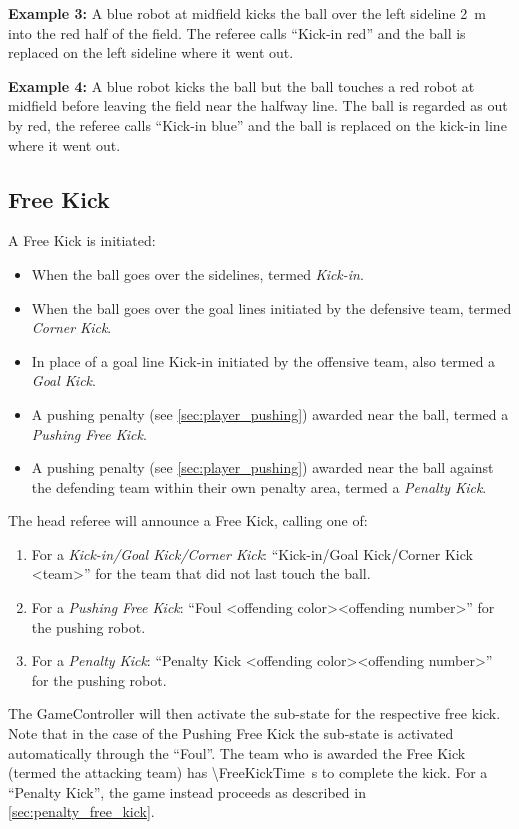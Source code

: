   \textbf{Example 3:} A blue robot at midfield kicks the ball over the left sideline \qty{2}{\metre} into the red half of the field. The referee calls ``Kick-in red'' and the ball is replaced on the left sideline where it went out.

  \textbf{Example 4:} A blue robot kicks the ball but the ball touches a red robot at midfield before leaving the field near the halfway line. The ball is regarded as out by red, the referee calls ``Kick-in blue'' and the ball is replaced on the kick-in line where it went out.

\subsection{Free Kick}
\label{sec:free_kick}

A Free Kick is initiated:
\begin{itemize}
  \item When the ball goes over the sidelines, termed \emph{Kick-in}.
  \item When the ball goes over the goal lines initiated by the defensive team, termed \emph{Corner Kick}.
  \item In place of a goal line Kick-in initiated by the offensive team, also termed a \emph{Goal Kick}.
  \item A pushing penalty (see \cref{sec:player_pushing}) awarded near the ball, termed a \emph{Pushing Free Kick}.
  \item A pushing penalty (see \cref{sec:player_pushing}) awarded near the ball against the defending team within their own penalty area, termed a \textit{Penalty Kick}.
\end{itemize}

The head referee will announce a Free Kick, calling one of:
\begin{enumerate}
  \item For a \textit{Kick-in/Goal Kick/Corner Kick}: ``Kick-in/Goal Kick/Corner Kick \textless team\textgreater'' for the team that did not last touch the ball.
  \item For a \textit{Pushing Free Kick}: ``Foul \textless offending color\textgreater \textless offending number\textgreater'' for the pushing robot.
  \item For a \textit{Penalty Kick}:  ``Penalty Kick \textless offending color\textgreater \textless offending number\textgreater'' for the pushing robot.
\end{enumerate}

The GameController will then activate the sub-state for the respective free kick. Note that in the case of the Pushing Free Kick the sub-state is activated automatically through the ``Foul''.
The team who is awarded the Free Kick (termed the attacking team) has \qty{\FreeKickTime}{\second} to complete the kick.
For a ``Penalty Kick'', the game instead proceeds as described in \cref{sec:penalty_free_kick}.

